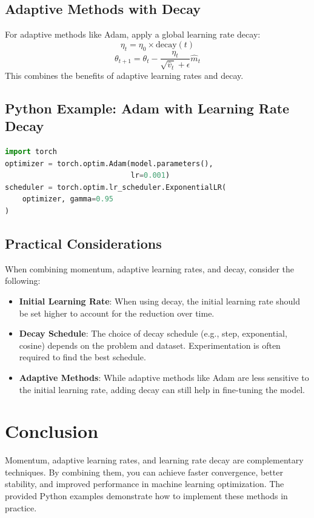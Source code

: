 \begin{notechapter}
\subsection{Adaptive Methods with Decay}
For adaptive methods like Adam, apply a global learning 
rate decay:
\[
\eta_t = \eta_0 \times \text{decay}(t)
\]
\[
\theta_{t+1} = \theta_t - \frac{\eta_t}{\sqrt{\hat{v}_t} + \epsilon} \hat{m}_t
\]
This combines the benefits of adaptive learning rates and 
decay.

\subsection{Python Example: Adam with Learning Rate Decay}
\begin{lstlisting}[language=Python]
import torch
optimizer = torch.optim.Adam(model.parameters(), 
                             lr=0.001)
scheduler = torch.optim.lr_scheduler.ExponentialLR(
    optimizer, gamma=0.95
)
\end{lstlisting}

\subsection{Practical Considerations}
When combining momentum, adaptive learning rates, and decay, 
consider the following:
\begin{itemize}
    \item \textbf{Initial Learning Rate}: When using decay, the 
          initial learning rate should be set higher to account 
          for the reduction over time.
    \item \textbf{Decay Schedule}: The choice of decay schedule 
          (e.g., step, exponential, cosine) depends on the problem 
          and dataset. Experimentation is often required to find 
          the best schedule.
    \item \textbf{Adaptive Methods}: While adaptive methods like 
          Adam are less sensitive to the initial learning rate, 
          adding decay can still help in fine-tuning the model.
\end{itemize}

\section{Conclusion}
Momentum, adaptive learning rates, and learning rate decay 
are complementary techniques. By combining them, you can 
achieve faster convergence, better stability, and improved 
performance in machine learning optimization. The provided 
Python examples demonstrate how to implement these methods 
in practice.
\end{notechapter}
